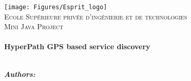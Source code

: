 
\begin{titlepage}
  \begin{center}
    \texttt{[image: Figures/Esprit\_logo]}
    \\[1cm]

    {
      \textsc
      {
        \LARGE
        Ecole Supérieure privée d'ingénierie et de technologies
      }
    }
    \\[1cm]
    {
      \textsc
      {
        \Large
        Mini Java Project
      }
    }
    \\[0.5cm]
    \HRule
    \\[0.5cm]

    {
      \huge\bfseries
      HyperPath GPS based service discovery
    }
    \\[0.5cm]
    \HRule
    \\[1.5cm]

    \begin{minipage}{0.4\textwidth}
      \begin{flushleft}
        \large
        \makebox
        {
          \textbf
          {
            \emph{Authors:}
          }
        }
        \\
        {
          \addtolength{\leftskip}{3mm}
          \\
          \\
        }
      \end{flushleft}
    \end{minipage}
    \begin{minipage}{0.4\textwidth}
      \begin{flushright} \large
        \begin{flushleft}
              \\
          {
            \addtolength{\leftskip}{3mm}
                                     \\
            \\ %
          }
        \end{flushleft}
      \end{flushright}
    \end{minipage}


\end{center}
\end{titlepage}
